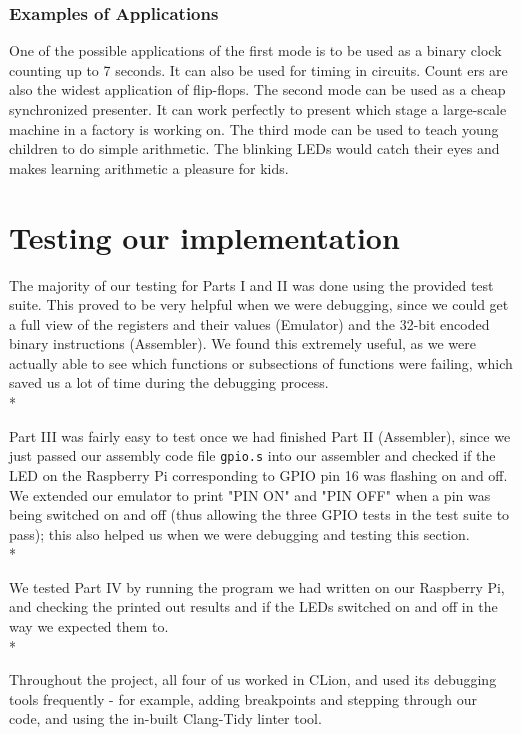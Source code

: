 \documentclass[letterpaper,11pt]{article}
\begin{document}
    \subsubsection{Examples of Applications}
    One of the possible applications of the first mode is to be used as a binary clock counting up to 7 seconds. It can also be used for timing in circuits. Count
    ers are also the widest application of flip-flops. The second mode can be used as a cheap synchronized presenter. It can work perfectly to present which stage a large-scale machine in a factory is working on. The third mode can be used to teach young children to do simple arithmetic. The blinking LEDs would catch their eyes and makes learning arithmetic a pleasure for kids.

    \section{Testing our implementation}
    The majority of our testing for Parts I and II was done using the provided test suite. This proved to be very helpful when we were debugging, since we could get a full view of the registers and their values (Emulator) and the 32-bit encoded binary instructions (Assembler). We found this extremely useful, as we were actually able to see which functions or subsections of functions were failing,   which saved us a lot of time during the debugging process.\\*

    \noindent Part III was fairly easy to test once we had finished Part II (Assembler), since we just passed our assembly code file \texttt{gpio.s} into our assembler and checked if the LED on the Raspberry Pi corresponding to GPIO pin 16 was flashing on and off. We extended our emulator to print "PIN ON" and "PIN OFF" when a pin was being switched on and off (thus allowing the three GPIO tests in the test suite to pass); this also helped us when we were debugging and testing this section. \\*

    \noindent We tested Part IV by running the program we had written on our Raspberry Pi, and checking the printed out results and if the LEDs switched on and off in the way we expected them to.\\*

    \noindent Throughout the project, all four of us worked in CLion, and used its debugging tools frequently - for example, adding breakpoints and stepping through our code, and using the in-built Clang-Tidy linter tool.
\end{document}
